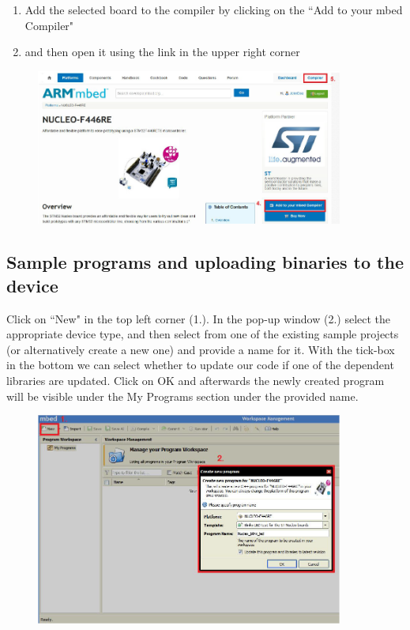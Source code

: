 \documentclass[a4paper]{article}
\begin{document}
\begin{enumerate}[resume]
    \item Add the selected board to the compiler by clicking on the ``Add to your mbed Compiler" 
    \item and then open it using the  link in the upper right corner
\end{enumerate}
\begin{figure}[H]
    \centering
    \includegraphics[width=0.9\textwidth]{figures/mbed-compiler.png}
\end{figure}

\subsection{Sample programs and uploading binaries to the device}

Click on ``New" in the top left corner (1.). In the pop-up window (2.) select the appropriate device type, and then 
select from one of the existing sample projects (or alternatively create a new one) and provide a name for it. With
the tick-box in the bottom we can select whether to update our code if one of the dependent libraries are updated.
Click on OK and afterwards the newly created program will be visible under the My Programs section under the  provided
name.
\begin{figure}[H]
    \centering
    \includegraphics[width=0.9\textwidth]{figures/mbed-new.png}
\end{figure}
\end{document}
